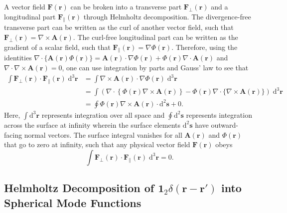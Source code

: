 \documentclass{article}
\begin{document}
A vector field $\mathbf{F}(\mathbf{r})$ can be broken into a transverse part $\mathbf{F}_\perp(\mathbf{r})$ and a longitudinal part $\mathbf{F}_\parallel(\mathbf{r})$ through Helmholtz decomposition. The divergence-free transverse part can be written as the curl of another vector field, such that $\mathbf{F}_\perp(\mathbf{r}) = \nabla\times\mathbf{A}(\mathbf{r})$. The curl-free longitudinal part can be written as the gradient of a scalar field, such that $\mathbf{F}_\parallel(\mathbf{r}) = \nabla\Phi(\mathbf{r})$. Therefore, using the identities $\nabla\cdot\{\mathbf{A}(\mathbf{r})\Phi(\mathbf{r})\} = \mathbf{A}(\mathbf{r})\cdot\nabla\Phi(\mathbf{r}) + \Phi(\mathbf{r})\nabla\cdot\mathbf{A}(\mathbf{r})$ and $\nabla\cdot\nabla\times\mathbf{A}(\mathbf{r}) = 0$, one can use integration by parts and Gauss' law to see that
\begin{equation}
\begin{split}
\int\mathbf{F}_\perp(\mathbf{r})\cdot\mathbf{F}_\parallel(\mathbf{r})\;\mathrm{d}^3\mathbf{r} &= \int\nabla\times\mathbf{A}(\mathbf{r})\cdot\nabla\Phi(\mathbf{r})\;\mathrm{d}^3\mathbf{r}\\
&=\int\left(\nabla\cdot\left\{\Phi(\mathbf{r})\nabla\times\mathbf{A}(\mathbf{r})\right\} - \Phi(\mathbf{r})\nabla\cdot\{\nabla\times\mathbf{A}(\mathbf{r})\}\right)\;\mathrm{d}^3\mathbf{r}\\
&= \oint\Phi(\mathbf{r})\nabla\times\mathbf{A}(\mathbf{r})\cdot\mathrm{d}^2\mathbf{s} + 0.
\end{split}
\end{equation}
Here, $\int\mathrm{d}^3\mathbf{r}$ represents integration over all space and $\oint\mathrm{d}^2\mathbf{s}$ represents integration across the surface at infinity wherein the surface elements $\mathrm{d}^2\mathbf{s}$ have outward-facing normal vectors. The surface integral vanishes for all $\mathbf{A}(\mathbf{r})$ and $\Phi(\mathbf{r})$ that go to zero at infinity, such that any physical vector field $\mathbf{F}(\mathbf{r})$ obeys
\begin{equation}\label{eq:helmholtzOrthogonality}
\int\mathbf{F}_\perp(\mathbf{r})\cdot\mathbf{F}_\parallel(\mathbf{r})\;\mathrm{d}^3\mathbf{r} = 0.
\end{equation}







\subsection{Helmholtz Decomposition of $\bm{1}_2\delta(\mathbf{r} - \mathbf{r}')$ into Spherical Mode Functions}\label{app:helmholtzDelta}
\end{document}
